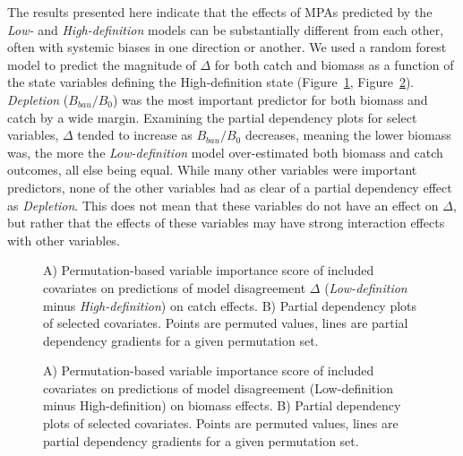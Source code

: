 \documentclass[
  default,
  lineno,
  referee]{sn-jnl}
\begin{document}
The results presented here indicate that the effects of MPAs predicted
by the \emph{Low-} and \emph{High-definition} models can be
substantially different from each other, often with systemic biases in
one direction or another. We used a random forest model to predict the
magnitude of \(\Delta\) for both catch and biomass as a function of the
state variables defining the High-definition state
(Figure~\ref{fig-catch-importance},
Figure~\ref{fig-biomass-importance}). \emph{Depletion} (\(B_{bau}/B_0\))
was the most important predictor for both biomass and catch by a wide
margin. Examining the partial dependency plots for select variables,
\(\Delta\) tended to increase as \(B_{bau}/B_0\) decreases, meaning the
lower biomass was, the more the \emph{Low-definition} model
over-estimated both biomass and catch outcomes, all else being equal.
While many other variables were important predictors, none of the other
variables had as clear of a partial dependency effect as
\emph{Depletion}. This does not mean that these variables do not have an
effect on \(\Delta\), but rather that the effects of these variables may
have strong interaction effects with other variables.

\begin{figure}


\caption{\label{fig-catch-importance}A) Permutation-based variable
importance score of included covariates on predictions of model
disagreement \(\Delta\) (\emph{Low-definition} minus
\emph{High-definition}) on catch effects. B) Partial dependency plots of
selected covariates. Points are permuted values, lines are partial
dependency gradients for a given permutation set.}

\end{figure}%

\begin{figure}


\caption{\label{fig-biomass-importance}A) Permutation-based variable
importance score of included covariates on predictions of model
disagreement (Low-definition minus High-definition) on biomass effects.
B) Partial dependency plots of selected covariates. Points are permuted
values, lines are partial dependency gradients for a given permutation
set.}

\end{figure}%
\end{document}
